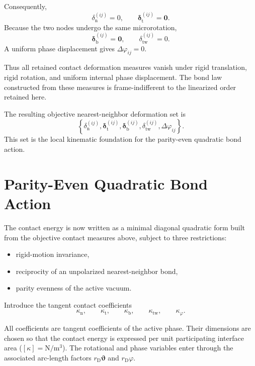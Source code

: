 Consequently,
\begin{equation}
    \delta_{\mathrm{n}}^{(ij)}=0, \qquad \boldsymbol{\delta}_{\mathrm{t}}^{(ij)}=\mathbf{0}.
\end{equation}
Because the two nodes undergo the same microrotation,
\begin{equation}
    \boldsymbol{\delta}_{\mathrm{b}}^{(ij)}=\mathbf{0}, \qquad \delta_{\mathrm{tw}}^{(ij)}=0.
\end{equation}
A uniform phase displacement gives $\Delta\varphi_{ij}=0$.

Thus all retained contact deformation measures vanish under rigid translation, rigid rotation, and uniform internal phase displacement. The bond law constructed from these measures is frame-indifferent to the linearized order retained here.

The resulting objective nearest-neighbor deformation set is
\begin{equation}
    \left\{ \delta_{\mathrm{n}}^{(ij)}, \boldsymbol{\delta}_{\mathrm{t}}^{(ij)}, \boldsymbol{\delta}_{\mathrm{b}}^{(ij)}, \delta_{\mathrm{tw}}^{(ij)}, \Delta\varphi_{ij} \right\}.
\end{equation}
This set is the local kinematic foundation for the parity-even quadratic bond action.


\section{Parity-Even Quadratic Bond Action}

The contact energy is now written as a minimal diagonal quadratic form built from the objective contact measures above, subject to three restrictions:
\begin{itemize}
    \item rigid-motion invariance,
    \item reciprocity of an unpolarized nearest-neighbor bond,
    \item parity evenness of the active vacuum.
\end{itemize}

Introduce the tangent contact coefficients
\begin{equation}
    \kappa_{\mathrm{n}}, \qquad \kappa_{\mathrm{t}}, \qquad \kappa_{\mathrm{b}}, \qquad \kappa_{\mathrm{tw}}, \qquad \kappa_\varphi.
\end{equation}

All coefficients are tangent coefficients of the active phase. Their dimensions are chosen so that the contact energy is expressed per unit participating interface area ($[\kappa] = \mathrm{N/m^3}$). The rotational and phase variables enter through the associated arc-length factors $r_{\mathrm{D}}\boldsymbol{\vartheta}$ and $r_{\mathrm{D}}\varphi$.

